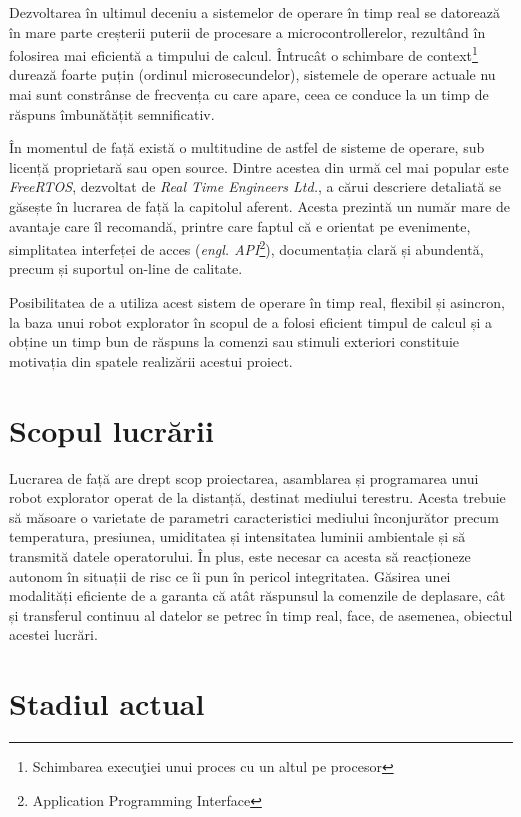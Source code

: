 Dezvoltarea în ultimul deceniu a sistemelor de operare în timp real se datorează în mare parte creșterii puterii de procesare a microcontrollerelor, rezultând în folosirea mai eficientă a timpului de calcul. Întrucât o schimbare de context\footnote{Schimbarea execuţiei unui proces cu un altul pe procesor} durează foarte puțin (ordinul microsecundelor), sistemele de operare actuale nu mai sunt constrânse de frecvența cu care apare, ceea ce conduce la un timp de răspuns îmbunătățit semnificativ.

În momentul de față există o multitudine de astfel de sisteme de operare, sub licență proprietară sau open source. Dintre acestea din urmă cel mai popular este \textit{FreeRTOS}, dezvoltat de \textit{Real Time Engineers Ltd.}, a cărui descriere detaliată se găsește în lucrarea de față la capitolul aferent. Acesta prezintă un număr mare de avantaje care îl recomandă, printre care faptul că e orientat pe evenimente, simplitatea interfeței de acces (\textit{engl. API}\footnote{Application Programming Interface}), documentația clară și abundentă, precum și suportul on-line de calitate.

Posibilitatea de a utiliza acest sistem de operare în timp real, flexibil și asincron, la baza unui robot explorator în scopul de a folosi eficient timpul de calcul și a obține un timp bun de răspuns la comenzi sau stimuli exteriori constituie motivația din spatele realizării acestui proiect.


\section{Scopul lucrării}

Lucrarea de față are drept scop proiectarea, asamblarea și programarea unui robot explorator operat de la distanță, destinat mediului terestru. Acesta trebuie să măsoare o varietate de parametri caracteristici mediului înconjurător precum temperatura, presiunea, umiditatea și intensitatea luminii ambientale și să transmită datele operatorului. În plus, este necesar ca acesta să reacționeze autonom în situații de risc ce îi pun în pericol integritatea. Găsirea unei modalități eficiente de a garanta că atât răspunsul la comenzile de deplasare, cât și transferul continuu al datelor se petrec în timp real, face, de asemenea, obiectul acestei lucrări.


\section{Stadiul actual}

